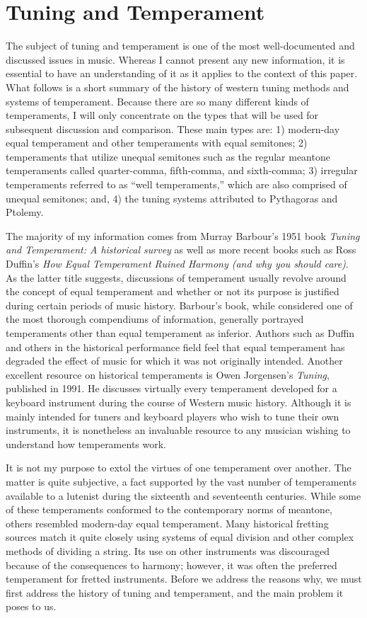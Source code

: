 \chapter{Tuning and Temperament}

The subject of tuning and temperament is one of the most well-documented and discussed issues in
music. Whereas I cannot present any new information, it is essential to have an understanding of it
as it applies to the context of this paper. What follows is a short summary of the history of
western tuning methods and systems of temperament.  Because there are so many different kinds of
temperaments, I will only concentrate on the types that will be used for subsequent discussion and
comparison.  These main types are: 1) modern-day equal temperament and other temperaments with equal
semitones; 2) temperaments that utilize unequal semitones such as the regular meantone temperaments
called quarter-comma, fifth-comma, and sixth-comma; 3) irregular temperaments referred to as ``well
temperaments,'' which  are also comprised of unequal semitones; and, 4) the tuning systems
attributed to Pythagoras and Ptolemy.

The majority of my information comes from Murray Barbour's 1951 book \textit{Tuning and Temperament:
A historical survey} as well as more recent books such as Ross Duffin's \textit{How Equal
Temperament Ruined Harmony (and why you should care)}.  As the latter title suggests, discussions of
temperament usually revolve around the concept of equal temperament and whether or not its purpose
is justified during certain periods of music history.  Barbour's book, while considered one of the
most thorough compendiums of information, generally portrayed temperaments other than equal
temperament as inferior. Authors such as Duffin and others in the historical performance field feel
that equal temperament has degraded the effect of music for which it was not originally intended.
Another excellent resource on historical temperaments is Owen Jorgensen's \textit{Tuning}, published
in 1991.  He discusses virtually every temperament developed for a keyboard instrument during
the course of Western music history.  Although it is mainly intended for tuners and keyboard
players who wish to tune their own instruments, it is nonetheless an invaluable resource to any
musician wishing to understand how temperaments work.

It is not my purpose to extol the virtues of one temperament over another.  The matter is quite
subjective, a fact supported by the vast number of temperaments available to a lutenist during the
sixteenth and seventeenth centuries.  While some of these temperaments conformed to the contemporary
norms of meantone, others resembled modern-day equal temperament.  Many historical fretting sources
match it quite closely using systems of equal division and other complex methods of dividing a
string.  Its use on other instruments was discouraged because of the consequences to harmony;
however, it was often the preferred temperament for fretted instruments.  Before we address the
reasons why, we must first address the history of tuning and temperament, and the main problem it
poses to us.


